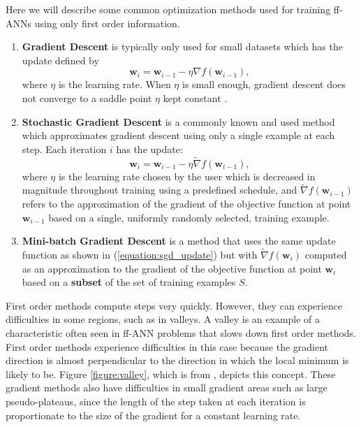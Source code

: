 \documentclass[letterpaper,12pt,titlepage,oneside,final]{book}
\begin{document}
	Here we will describe some common optimization methods used for training ff-ANNs using only first order information. 
	\begin{enumerate}
		\item {\textbf{Gradient Descent} is typically only used for small datasets which has the update defined by 
			\begin{equation}
			\mathbf{w}_{i} = \mathbf{w}_{i-1} - \eta{\nabla}{f(\mathbf{w}_{i-1})},
			\label{equation:gd_update}
			\end{equation}
			where $\eta$ is the learning rate. When $\eta$ is small enough, gradient descent does not converge to a saddle point $\eta$ kept constant \cite{gd_converges.paper}.
		}
		\item{\textbf{Stochastic Gradient Descent} is a commonly known and used method which approximates gradient descent using only a single example at each step. Each iteration $i$ has the update:
			\begin{equation}
			\mathbf{w}_{i} = \mathbf{w}_{i-1} - \eta\widetilde{\nabla}{f(\mathbf{w}_{i-1})},
			\label{equation:sgd_update}
			\end{equation}
			where $\eta$ is the learning rate chosen by the user which is decreased in magnitude throughout training using a predefined schedule, and $\widetilde{\nabla}{f(\mathbf{w}_{i-1})}$ refers to the approximation of the gradient of the objective function at point $\mathbf{w}_{i-1}$ based on a single, uniformly randomly selected, training example. 
		}   
		\item{\textbf{Mini-batch Gradient Descent} is a method that uses the same update function as shown in (\ref{equation:sgd_update}) but with $\widetilde{\nabla}{f(\mathbf{w}_{i})}$ computed as an approximation to the gradient of the objective function at point $\mathbf{w}_{i}$ based on a \textbf{subset} of the set of training examples $S$.}
	\end{enumerate}
	First order methods compute steps very quickly. However, they can experience difficulties in some regions, such as in valleys. A valley is an example of a characteristic often seen in ff-ANN problems \cite{Shepherd.1997} that slows down first order methods. First order methods experience difficulties in this case because the gradient direction is almost perpendicular to the direction in which the local minimum is likely to be. Figure \ref{figure:valley}, which is from \cite{martens2010deep}, depicts this concept. These gradient methods also have difficulties in small gradient areas such as large pseudo-plateaus, since the length of the step taken at each iteration is proportionate to the size of the gradient for a constant learning rate.
	
\end{document}
